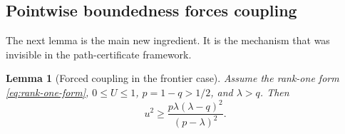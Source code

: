 \documentclass[11pt]{article}
\newtheorem{lemma}[theorem]{Lemma}
\begin{document}
\subsection{Pointwise boundedness forces coupling}

The next lemma is the main new ingredient.  It is the mechanism that was invisible in the path-certificate framework.

\begin{lemma}[Forced coupling in the frontier case]\label{lem:forced-coupling}
Assume the rank-one form \eqref{eq:rank-one-form}, $0\le U\le1$, $p=1-q>1/2$, and $\lambda>q$.  Then
\begin{equation}\label{eq:forced-coupling}
        u^2\ge
        \frac{p\lambda(\lambda-q)^2}{(p-\lambda)^2}.
\end{equation}
\end{lemma}
\end{document}
